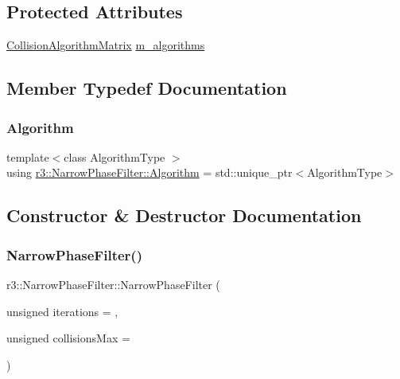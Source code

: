 \subsection*{Protected Attributes}
\begin{DoxyCompactItemize}
\item 
\mbox{\hyperlink{classr3_1_1_collision_algorithm_matrix}{Collision\+Algorithm\+Matrix}} \mbox{\hyperlink{classr3_1_1_narrow_phase_filter_a476cf750e3cd55d9e36a011eb0c447af}{m\+\_\+algorithms}}
\end{DoxyCompactItemize}


\subsection{Member Typedef Documentation}
\mbox{\label{classr3_1_1_narrow_phase_filter_aebe310c944167ad73abf098ccc68ed88}} 
\subsubsection{\texorpdfstring{Algorithm}{Algorithm}}
{\footnotesize\ttfamily template$<$class Algorithm\+Type $>$ \\
using \mbox{\hyperlink{classr3_1_1_narrow_phase_filter_aebe310c944167ad73abf098ccc68ed88}{r3\+::\+Narrow\+Phase\+Filter\+::\+Algorithm}} =  std\+::unique\+\_\+ptr$<$Algorithm\+Type$>$}



\subsection{Constructor \& Destructor Documentation}
\mbox{\label{classr3_1_1_narrow_phase_filter_a4384e2d6e5f3e5e90b7bf8fffb3e5171}} 
\subsubsection{\texorpdfstring{Narrow\+Phase\+Filter()}{NarrowPhaseFilter()}}
{\footnotesize\ttfamily r3\+::\+Narrow\+Phase\+Filter\+::\+Narrow\+Phase\+Filter (\begin{DoxyParamCaption}\item[{unsigned}]{iterations = {},  }\item[{unsigned}]{collisions\+Max = {} }\end{DoxyParamCaption})\hspace{0.3cm}{\ttfamily [explicit]}}

